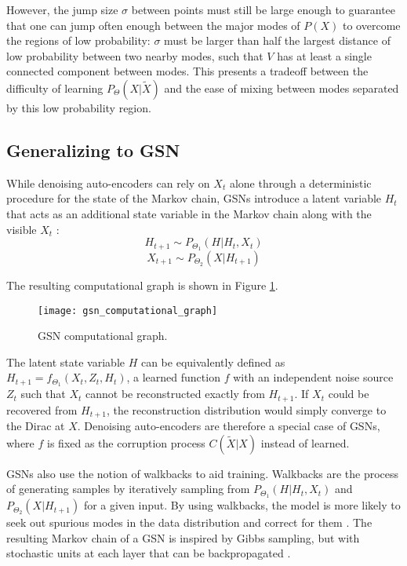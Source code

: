 However, the jump size \(\sigma\) between points must still be large enough to guarantee that one can jump often enough between the major modes of \(P(X)\) to overcome the regions of low probability: \(\sigma\) must be larger than half the largest distance of low probability between two nearby modes, such that \(V\) has at least a single connected component between modes. This presents a tradeoff between the difficulty of learning \(P_{\Theta}(X|\widetilde{X})\) and the ease of mixing between modes separated by this low probability region.


\subsection{Generalizing to GSN}

While denoising auto-encoders can rely on \(X_t\) alone through a deterministic procedure for the state of the Markov chain, GSNs introduce a latent variable \(H_t\) that acts as an additional state variable in the Markov chain along with the visible \(X_t\) \cite{gsn}:
\begin{equation}
	H_{t+1} \sim P_{\Theta_1}(H|H_t, X_t)
\end{equation}
\begin{equation}
	X_{t+1} \sim  P_{\Theta_2}(X|H_{t+1})
\end{equation}

The resulting computational graph is shown in Figure \ref{fig:gsn}.
\begin{figure}[h!]
  \centering
    \texttt{[image: gsn\_computational\_graph]}
\caption{GSN computational graph.}\label{fig:gsn}
\end{figure}

The latent state variable \(H\) can be equivalently defined as \(H_{t+1} = f_{\Theta_1}(X_t,Z_t,H_t)\), a learned function \(f\) with an independent noise source \(Z_t\) such that \(X_t\) cannot be reconstructed exactly from \(H_{t+1}\). If \(X_t\) could be recovered from \(H_{t+1}\), the reconstruction distribution would simply converge to the Dirac at \(X\). Denoising auto-encoders are therefore a special case of GSNs, where \(f\) is fixed as the corruption process \(C(\widetilde{X}|X)\) instead of learned.

GSNs also use the notion of walkbacks to aid training. Walkbacks are the process of generating samples by iteratively sampling from \(P_{\Theta_1}(H|H_t, X_t)\) and \(P_{\Theta_2}(X|H_{t+1})\) for a given input. By using walkbacks, the model is more likely to seek out spurious modes in the data distribution and correct for them \cite{bengio13a}. The resulting Markov chain of a GSN is inspired by Gibbs sampling, but with stochastic units at each layer that can be backpropagated \cite{rezende14}.


